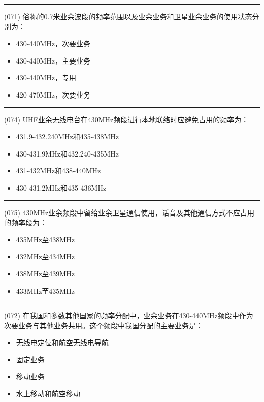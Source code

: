 \documentclass[twocolumn,hyperref,UTF8]{ctexart}  %
\begin{document}
\noindent\rule{0.5\textwidth}{1pt}
\heiti (071) 俗称的0.7米业余波段的频率范围以及业余业务和卫星业余业务的使用状态分别为： \songti {\color{gray} [LK0159] }
\begin{itemize}
	\item  430-440MHz，次要业务
	\item  430-440MHz，{\color{red}主要业务}
	\item  430-440MHz，{\color{red}专用}
	\item  {\color{red}420-470}MHz，次要业务
\end{itemize}


\noindent\rule{0.5\textwidth}{1pt}
\heiti (074) UHF业余无线电台在430MHz频段进行{\color{cyan}本地联络时}应避免占用的频率为： \songti {\color{gray} [LK0172] }
\begin{itemize}
	\item  431.9-432.240MHz和435-438MHz
	\item  430-431.9MHz和432.240-435MHz
	\item  431-432MHz和438-440MHz
	\item  430-431.2MHz和435-436MHz
\end{itemize}


\noindent\rule{0.5\textwidth}{1pt}
\heiti (075) 430MHz业余频段中{\color{cyan}留给业余卫星通信使用，话音及其他通信方式不应占用}的频率段为： \songti {\color{gray} [LK1031] }
\begin{itemize}
	\item  435MHz至438MHz
	\item  432MHz至434MHz
	\item  438MHz至439MHz
	\item  433MHz至435MHz
\end{itemize}


\noindent\rule{0.5\textwidth}{1pt}
\heiti (072) 在我国和多数其他国家的频率分配中，业余业务在430-440MHz频段中作为次要业务与其他业务共用。这个频段中我国分配的主要业务是： \songti {\color{gray} [LK0160] }
\begin{itemize}
	\item  无线电定位和航空无线电导航
	\item  固定业务
	\item  移动业务
	\item  水上移动和航空移动
\end{itemize}




\end{document}
